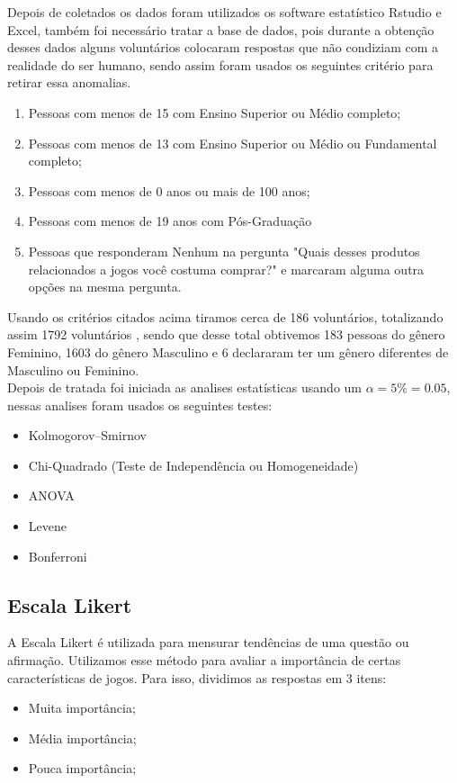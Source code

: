 \documentclass[11pt,a4paper]{article}
\begin{document}
Depois de coletados os dados foram utilizados os software estatístico Rstudio e Excel, também foi necessário tratar a base de dados, pois durante a obtenção desses dados alguns voluntários colocaram respostas que não condiziam com a realidade do ser humano, sendo assim foram usados os seguintes critério para retirar essa anomalias.
 \begin{enumerate}[label=(\roman*)]
\item Pessoas com menos de 15 com Ensino Superior ou Médio completo; 
\item Pessoas com menos de 13 com  Ensino Superior ou Médio  ou Fundamental completo;
\item Pessoas com menos de 0 anos ou mais de 100 anos;
\item Pessoas com menos de 19 anos com Pós-Graduação
\item Pessoas que responderam Nenhum na pergunta "Quais desses produtos relacionados a jogos você costuma comprar?"  e marcaram alguma outra opções na mesma pergunta.
\end{enumerate}
Usando os critérios citados acima tiramos cerca de 186 voluntários, totalizando assim 1792 voluntários , sendo que desse total obtivemos 183 pessoas do gênero Feminino, 1603 do gênero Masculino e 6 declararam ter um gênero diferentes de Masculino  ou Feminino. 
\\

Depois de tratada foi iniciada as analises estatísticas usando um $\alpha=5\%=0.05$, nessas analises foram usados os seguintes testes:
\begin{itemize}[noitemsep,nolistsep]
\item Kolmogorov–Smirnov
\item Chi-Quadrado (Teste de Independência ou Homogeneidade)
\item ANOVA
\item Levene
\item Bonferroni
\end{itemize}

\subsection{Escala Likert}

A Escala Likert é utilizada para mensurar tendências de uma questão ou afirmação. Utilizamos esse método para avaliar a importância de certas características de jogos. Para isso, dividimos as respostas em 3 itens:

\begin{itemize}[noitemsep,nolistsep]
\item Muita importância; 
\item Média importância;
\item Pouca importância;
\end{itemize}
 
\end{document}
